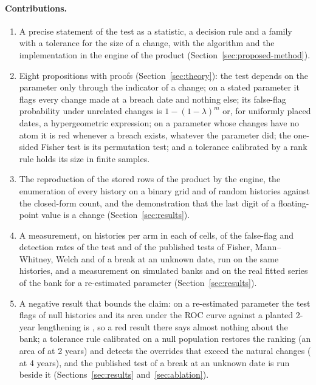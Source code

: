 \paragraph{Contributions.}
\begin{enumerate}
\item A precise statement of the test as a statistic, a decision rule and a family with a tolerance for the size of a change, with the algorithm and the implementation in the engine of the product (Section~\ref{sec:proposed-method}).
\item Eight propositions with proofs (Section~\ref{sec:theory}): the test depends on the parameter only through the indicator of a change; on a stated parameter it flags every change made at a breach date and nothing else; its false-flag probability under unrelated changes is $1-(1-\lambda)^m$ or, for uniformly placed dates, a hypergeometric expression; on a parameter whose changes have no atom it is red whenever a breach exists, whatever the parameter did; the one-sided Fisher test is its permutation test; and a tolerance calibrated by a rank rule holds its size in finite samples.
\item The reproduction of the stored rows of the product by the engine, the enumeration of every history on a binary grid and of \randomN{} random histories against the closed-form count, and the demonstration that the last digit of a floating-point value is a change (Section~\ref{sec:results}).
\item A measurement, on \statedN{} histories per arm in each of \statedCells{} cells, of the false-flag and detection rates of the test and of the published tests of Fisher, Mann--Whitney, Welch and of a break at an unknown date, run on the same histories, and a measurement on \fitN{} simulated banks and on the real fitted series of the bank for a re-estimated parameter (Section~\ref{sec:results}).
\item A negative result that bounds the claim: on a re-estimated parameter the test flags \fitNullEngine{} of null histories and its area under the ROC curve against a planted 2-year lengthening is \fitAucCEngine{}, so a red result there says almost nothing about the bank; a tolerance rule calibrated on a null population restores the ranking (an area of \fitAucCTol{} at 2 years) and detects the overrides that exceed the natural changes (\fitAddDTol{} at 4 years), and the published test of a break at an unknown date is run beside it (Sections~\ref{sec:results} and~\ref{sec:ablation}).
\end{enumerate}

